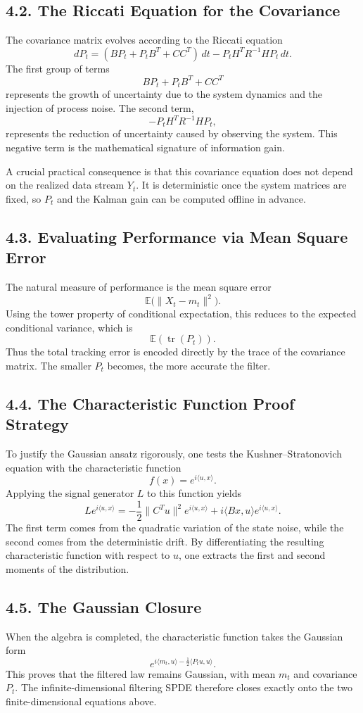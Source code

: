 \documentclass[11pt]{article}
\theoremstyle{definition}
\theoremstyle{remark}
\begin{document}
\subsection*{4.2. The Riccati Equation for the Covariance}
The covariance matrix evolves according to the Riccati equation
\[
dP_t
=
(BP_t+P_tB^T+CC^T)\,dt
-P_tH^TR^{-1}HP_t\,dt.
\]
The first group of terms
\[
BP_t+P_tB^T+CC^T
\]
represents the growth of uncertainty due to the system dynamics and the injection of process noise. The second term,
\[
-P_tH^TR^{-1}HP_t,
\]
represents the reduction of uncertainty caused by observing the system. This negative term is the mathematical signature of information gain.

A crucial practical consequence is that this covariance equation does not depend on the realized data stream \(Y_t\). It is deterministic once the system matrices are fixed, so \(P_t\) and the Kalman gain can be computed offline in advance.

\subsection*{4.3. Evaluating Performance via Mean Square Error}
The natural measure of performance is the mean square error
\[
\mathbb E\bigl(\|X_t-m_t\|^2\bigr).
\]
Using the tower property of conditional expectation, this reduces to the expected conditional variance, which is
\[
\mathbb E(\operatorname{tr}(P_t)).
\]
Thus the total tracking error is encoded directly by the trace of the covariance matrix. The smaller \(P_t\) becomes, the more accurate the filter.

\subsection*{4.4. The Characteristic Function Proof Strategy}
To justify the Gaussian ansatz rigorously, one tests the Kushner--Stratonovich equation with the characteristic function
\[
f(x)=e^{i\langle u,x\rangle}.
\]
Applying the signal generator \(L\) to this function yields
\[
Le^{i\langle u,x\rangle}
=
-\frac12\|C^Tu\|^2e^{i\langle u,x\rangle}
+
i\langle Bx,u\rangle e^{i\langle u,x\rangle}.
\]
The first term comes from the quadratic variation of the state noise, while the second comes from the deterministic drift. By differentiating the resulting characteristic function with respect to \(u\), one extracts the first and second moments of the distribution.

\subsection*{4.5. The Gaussian Closure}
When the algebra is completed, the characteristic function takes the Gaussian form
\[
e^{i\langle m_t,u\rangle-\frac12\langle P_tu,u\rangle}.
\]
This proves that the filtered law remains Gaussian, with mean \(m_t\) and covariance \(P_t\). The infinite-dimensional filtering SPDE therefore closes exactly onto the two finite-dimensional equations above.
\end{document}
